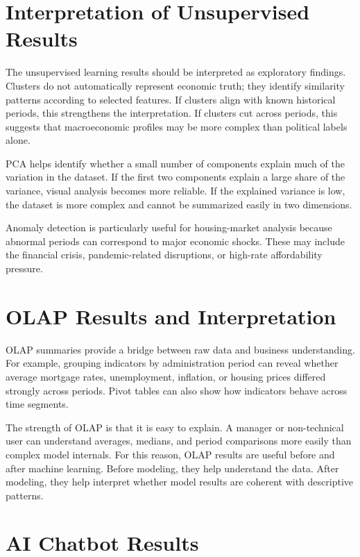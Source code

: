 \section{Interpretation of Unsupervised Results}

The unsupervised learning results should be interpreted as exploratory findings. Clusters do not automatically represent economic truth; they identify similarity patterns according to selected features. If clusters align with known historical periods, this strengthens the interpretation. If clusters cut across periods, this suggests that macroeconomic profiles may be more complex than political labels alone.

PCA helps identify whether a small number of components explain much of the variation in the dataset. If the first two components explain a large share of the variance, visual analysis becomes more reliable. If the explained variance is low, the dataset is more complex and cannot be summarized easily in two dimensions.

Anomaly detection is particularly useful for housing-market analysis because abnormal periods can correspond to major economic shocks. These may include the financial crisis, pandemic-related disruptions, or high-rate affordability pressure.

\section{OLAP Results and Interpretation}

OLAP summaries provide a bridge between raw data and business understanding. For example, grouping indicators by administration period can reveal whether average mortgage rates, unemployment, inflation, or housing prices differed strongly across periods. Pivot tables can also show how indicators behave across time segments.

The strength of OLAP is that it is easy to explain. A manager or non-technical user can understand averages, medians, and period comparisons more easily than complex model internals. For this reason, OLAP results are useful before and after machine learning. Before modeling, they help understand the data. After modeling, they help interpret whether model results are coherent with descriptive patterns.

\section{AI Chatbot Results}

